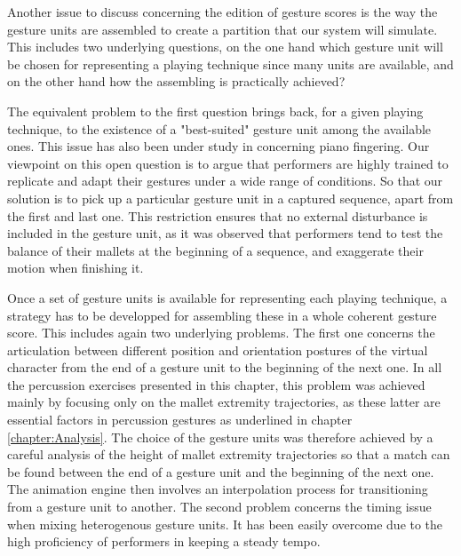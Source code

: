 Another issue to discuss concerning the edition of gesture scores is the way the gesture units are assembled to create a partition that our system will simulate. This includes two underlying questions, on the one hand which gesture unit will be chosen for representing a playing technique since many units are available, and on the other hand how the assembling is practically achieved?

The equivalent problem to the first question brings back, for a given playing technique, to the existence of a "best-suited" gesture unit among the available ones. This issue has also been under study in  concerning piano fingering. Our viewpoint on this open question is to argue that performers are highly trained to replicate and adapt their  gestures under a wide range of conditions. So that our solution is to pick up a particular gesture unit in a captured sequence, apart from the first and last one. This restriction ensures that no external disturbance is included in the gesture unit, as it was observed that performers tend to test the balance of their mallets at the beginning of a sequence, and exaggerate their motion when finishing it.

Once a set of gesture units is available for representing each playing technique, a strategy has to be developped for assembling these in a whole coherent gesture score. This includes again two underlying problems. The first one concerns the articulation between different position and orientation postures of the virtual character from the end of a gesture unit to the beginning of the next one. In all the percussion exercises presented in this chapter, this problem was achieved mainly by focusing only on the mallet extremity trajectories, as these latter are essential factors in percussion gestures as underlined in chapter \ref{chapter:Analysis}. The choice of the gesture units was therefore achieved by a careful analysis of the height of mallet extremity trajectories so that a match can be found between the end of a gesture unit and the beginning of the next one. The animation engine then involves an interpolation process for transitioning from a gesture unit to another. The second problem concerns the timing issue when mixing heterogenous gesture units. It has been easily overcome due to the high proficiency of performers in keeping a steady tempo.


